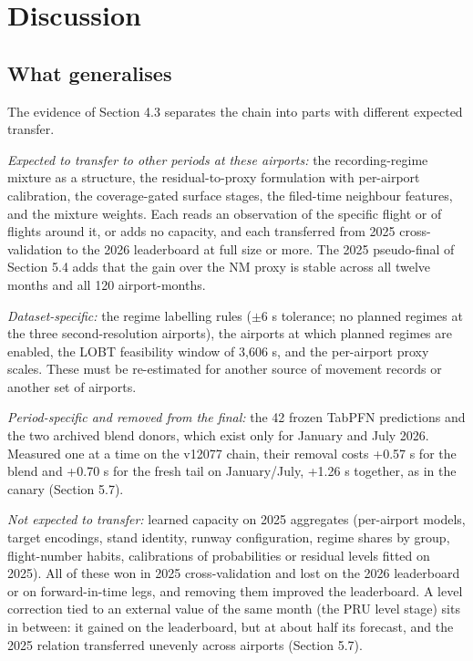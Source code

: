 \documentclass[11pt,a4paper]{article}
\begin{document}
\section{Discussion}\label{discussion}

\subsection{What generalises}\label{what-generalises}

The evidence of Section 4.3 separates the chain into parts with different expected transfer.

\emph{Expected to transfer to other periods at these airports:} the recording-regime mixture as a structure, the residual-to-proxy formulation with per-airport calibration, the coverage-gated surface stages, the filed-time neighbour features, and the mixture weights. Each reads an observation of the specific flight or of flights around it, or adds no capacity, and each transferred from 2025 cross-validation to the 2026 leaderboard at full size or more. The 2025 pseudo-final of Section 5.4 adds that the gain over the NM proxy is stable across all twelve months and all 120 airport-months.

\emph{Dataset-specific:} the regime labelling rules ($\pm$6 s tolerance; no planned regimes at the three second-resolution airports), the airports at which planned regimes are enabled, the LOBT feasibility window of 3,606 s, and the per-airport proxy scales. These must be re-estimated for another source of movement records or another set of airports.

\emph{Period-specific and removed from the final:} the 42 frozen TabPFN predictions and the two archived blend donors, which exist only for January and July 2026. Measured one at a time on the v12077 chain, their removal costs +0.57 s for the blend and +0.70 s for the fresh tail on January/July, +1.26 s together, as in the canary (Section 5.7).

\emph{Not expected to transfer:} learned capacity on 2025 aggregates (per-airport models, target encodings, stand identity, runway configuration, regime shares by group, flight-number habits, calibrations of probabilities or residual levels fitted on 2025). All of these won in 2025 cross-validation and lost on the 2026 leaderboard or on forward-in-time legs, and removing them improved the leaderboard. A level correction tied to an external value of the same month (the PRU level stage) sits in between: it gained on the leaderboard, but at about half its forecast, and the 2025 relation transferred unevenly across airports (Section 5.7).
\end{document}
